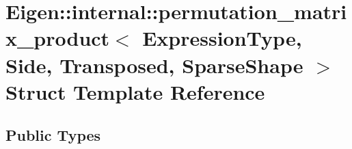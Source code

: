 \hypertarget{struct_eigen_1_1internal_1_1permutation__matrix__product_3_01_expression_type_00_01_side_00_01_t20ccd76e9ac5a7579d51cf9e9a5cbb67}{}\section{Eigen\+:\+:internal\+:\+:permutation\+\_\+matrix\+\_\+product$<$ Expression\+Type, Side, Transposed, Sparse\+Shape $>$ Struct Template Reference}
\label{struct_eigen_1_1internal_1_1permutation__matrix__product_3_01_expression_type_00_01_side_00_01_t20ccd76e9ac5a7579d51cf9e9a5cbb67}
\subsection*{Public Types}
